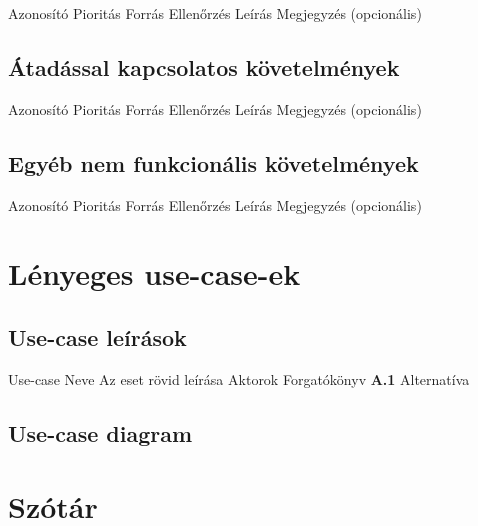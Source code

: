 \begin{kovetelmeny}
	{Azonosító} %
	{Pioritás} %
	{Forrás} %
	{Ellenőrzés} %
	{Leírás} %
    Megjegyzés (opcionális)
\end{kovetelmeny}

\subsection{Átadással kapcsolatos követelmények}
\begin{kovetelmeny}
    {Azonosító} %
    {Pioritás} %
    {Forrás} %
    {Ellenőrzés} %
    {Leírás} %
    Megjegyzés (opcionális)
\end{kovetelmeny}

\subsection{Egyéb nem funkcionális követelmények}
\begin{kovetelmeny}
    {Azonosító} %
    {Pioritás} %
    {Forrás} %
    {Ellenőrzés} %
    {Leírás} %
    Megjegyzés (opcionális)
\end{kovetelmeny}

\section{Lényeges use-case-ek}
\subsection{Use-case leírások}

\begin{use-case}
	{Use-case Neve}
	{Az eset rövid leírása}
	{Aktorok}
	Forgatókönyv \newline 
        \textbf{A.1} Alternatíva
\end{use-case}

\subsection{Use-case diagram}

\section{Szótár}

